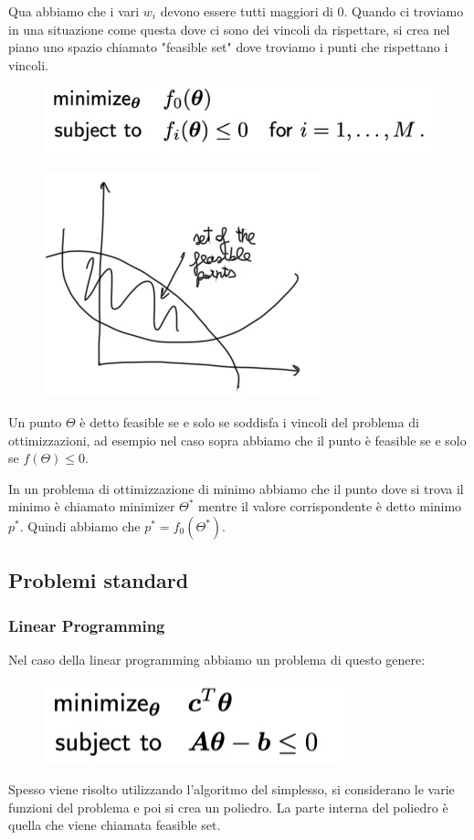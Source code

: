 \documentclass[14pt]{extreport}
\begin{document}
Qua abbiamo che i vari $w_i$ devono essere tutti maggiori di 0. Quando ci troviamo in una situazione come questa dove ci sono dei vincoli da
rispettare, si crea nel piano uno spazio chiamato "feasible set" dove troviamo i punti che rispettano i vincoli.
\begin{figure}[H]
\centering
\includegraphics[width=0.5\linewidth]{277.jpeg}
\end{figure}
\begin{figure}[H]
\centering
\includegraphics[width=0.4\linewidth]{276.jpeg}
\end{figure}

Un punto $\Theta$ è detto feasible se e solo se soddisfa i vincoli del problema di ottimizzazioni, ad esempio nel caso sopra abbiamo che il punto è
feasible se e solo se $f(\Theta) \leq 0$.

In un problema di ottimizzazione di minimo abbiamo che il punto dove si trova il minimo è chiamato minimizer $\Theta^*$ mentre il valore
corrispondente è detto minimo $p^*$. Quindi abbiamo che $p^* = f_0(\Theta^*)$.

\subsection{Problemi standard}

\subsubsection{Linear Programming}

Nel caso della linear programming abbiamo un problema di questo genere:
\begin{figure}[H]
\centering
\includegraphics[width=0.4\linewidth]{278.jpeg}
\end{figure}
Spesso viene risolto utilizzando l'algoritmo del simplesso, si considerano le varie funzioni del problema e poi si crea un poliedro. La parte interna
del poliedro è quella che viene chiamata feasible set.
\end{document}
